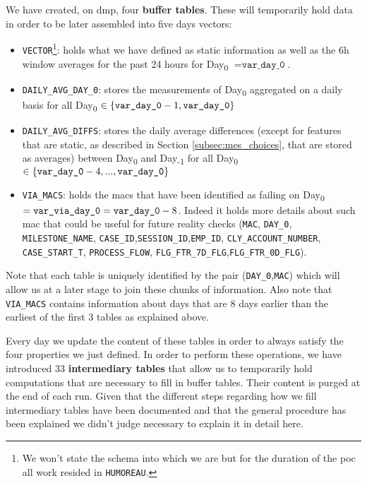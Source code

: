We have created, on \acrshort{dmp}, four \textbf{buffer tables}. These will temporarily hold data in order to be later assembled into five days vectors:
\begin{itemize}
	\item \texttt{VECTOR}\footnote{We won't state the schema into which we are but for the duration of the \acrshort{poc} all work resided in \texttt{HUMOREAU}.}: holds what we have defined as static information as well as the 6h window averages for the past 24 hours for Day\textsubscript{0} $= \texttt{var\_day\_0}$.
	\item \texttt{DAILY\_AVG\_DAY\_0}: stores the measurements of Day\textsubscript{0} aggregated on a daily basis for all Day\textsubscript{0} $\in \{\text{\texttt{var\_day\_0}}-1,\text{\texttt{var\_day\_0}}\}$
	\item \texttt{DAILY\_AVG\_DIFFS}: stores the daily average differences (except for features that are static, as described in Section \ref{subsec:mes_choices}, that are stored as averages) between Day\textsubscript{0} and Day\textsubscript{-1} for all Day\textsubscript{0} $\in \{\text{\texttt{var\_day\_0}}-4,...,\text{\texttt{var\_day\_0}}\}$
	\item \texttt{VIA\_MACS}: holds the \acrshort{mac}s that have been identified as failing on Day\textsubscript{0}$=\text{\texttt{var\_via\_day\_0}} = \text{\texttt{var\_day\_0}} - 8$. Indeed it holds more details about such \acrshort{mac} that could be useful for future reality checks (\texttt{MAC}, \texttt{DAY\_0}, \texttt{MILESTONE\_NAME}, \texttt{CASE\_ID},\texttt{SESSION\_ID},\texttt{EMP\_ID}, \texttt{CLY\_ACCOUNT\_NUMBER}, \texttt{CASE\_START\_T}, \texttt{PROCESS\_FLOW}, \texttt{FLG\_FTR\_7D\_FLG},\texttt{FLG\_FTR\_0D\_FLG}).
\end{itemize}
Note that each table is uniquely identified by the pair (\texttt{DAY\_0},\texttt{MAC}) which will allow us at a later stage to join these chunks of information. Also note that \texttt{VIA\_MACS} contains information about days that are 8 days earlier than the earliest of the first 3 tables as explained above.

Every day we update the content of these tables in order to always satisfy the four properties we just defined. In order to perform these operations, we have introduced 33 \textbf{intermediary tables} that allow us to temporarily hold computations that are necessary to fill in buffer tables. Their content is purged at the end of each run. Given that the different steps regarding how we fill intermediary tables have been documented and that the general procedure has been explained we didn't judge necessary to explain it in detail here.

